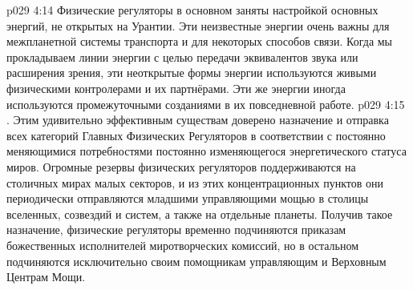 \vs p029 4:14 Физические регуляторы в основном заняты настройкой основных энергий, не открытых на Урантии. Эти неизвестные энергии очень важны для межпланетной системы транспорта и для некоторых способов связи. Когда мы прокладываем линии энергии с целью передачи эквивалентов звука или расширения зрения, эти неоткрытые формы энергии используются живыми физическими контролерами и их партнёрами. Эти же энергии иногда используются промежуточными созданиями в их повседневной работе.
\vs p029 4:15 . Этим удивительно эффективным существам доверено назначение и отправка всех категорий Главных Физических Регуляторов в соответствии с постоянно меняющимися потребностями постоянно изменяющегося энергетического статуса миров. Огромные резервы физических регуляторов поддерживаются на столичных мирах малых секторов, и из этих концентрационных пунктов они периодически отправляются младшими управляющими мощью в столицы вселенных, созвездий и систем, а также на отдельные планеты. Получив такое назначение, физические регуляторы временно подчиняются приказам божественных исполнителей миротворческих комиссий, но в остальном подчиняются исключительно своим помощникам управляющим и Верховным Центрам Мощи.
